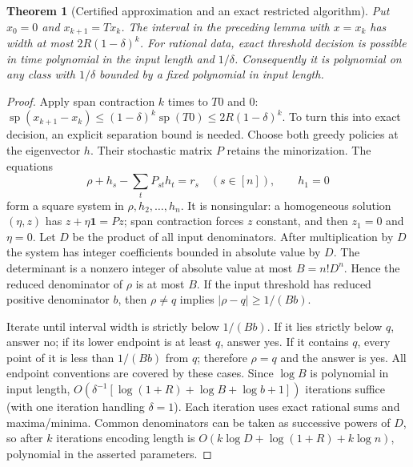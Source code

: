 \documentclass[11pt]{article}
\newtheorem{theorem}{Theorem}
\theoremstyle{definition}
\begin{document}
\begin{theorem}[Certified approximation and an exact restricted algorithm]
Put $x_0=0$ and $x_{k+1}=Tx_k$. The interval in the preceding lemma with
$x=x_k$ has width at most $2R(1-\delta)^k$.
For rational data, exact threshold decision is possible in time polynomial in
the input length and $1/\delta$. Consequently it is polynomial on any class
with $1/\delta$ bounded by a fixed polynomial in input length.
\end{theorem}
\begin{proof}
Apply span contraction $k$ times to $T0$ and $0$:
$\operatorname{sp}(x_{k+1}-x_k)\leq(1-\delta)^k\operatorname{sp}(T0)
\leq2R(1-\delta)^k$.
To turn this into exact decision, an explicit separation bound is needed.
Choose both greedy policies at the eigenvector $h$. Their stochastic matrix
$P$ retains the minorization. The equations
\[
 \rho+h_s-\sum_tP_{st}h_t=r_s\quad(s\in[n]),\qquad h_1=0
\]
form a square system in $\rho,h_2,\ldots,h_n$. It is nonsingular:
a homogeneous solution $(\eta,z)$ has $z+\eta\mathbf1=Pz$;
span contraction forces $z$ constant, and then $z_1=0$ and $\eta=0$.
Let $D$ be the product of all input denominators. After multiplication by $D$
the system has integer coefficients bounded in absolute value by $D$.
The determinant is a nonzero integer of absolute value at most
$B=n!D^n$. Hence the reduced denominator of $\rho$ is at most $B$.
If the input threshold has reduced positive denominator $b$, then
$\rho\ne q$ implies $|\rho-q|\geq1/(Bb)$.

Iterate until interval width is strictly below $1/(Bb)$. If it lies strictly
below $q$, answer no; if its lower endpoint is at least $q$, answer yes.
If it contains $q$, every point of it is less than $1/(Bb)$ from $q$;
therefore $\rho=q$ and the answer is yes. All endpoint conventions are
covered by these cases. Since $\log B$ is polynomial in input length,
$O(\delta^{-1}[\log(1+R)+\log B+\log b+1])$ iterations suffice
(with one iteration handling $\delta=1$).
Each iteration uses exact rational sums and maxima/minima. Common denominators
can be taken as successive powers of $D$, so after $k$ iterations encoding
length is $O(k\log D+\log(1+R)+k\log n)$, polynomial in the asserted parameters.
\end{proof}
\end{document}
